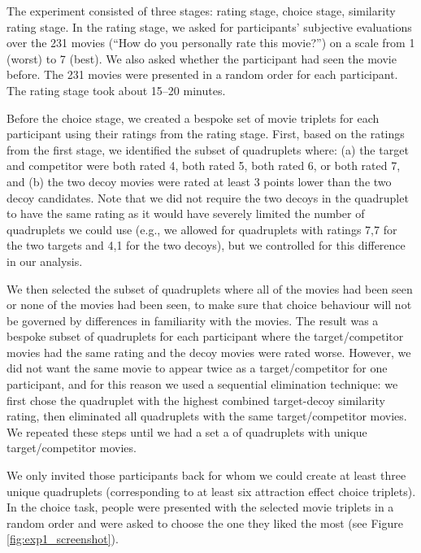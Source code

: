 \documentclass[12pt, a4paper]{article}
\begin{document}
The experiment consisted of three stages: rating stage, choice stage, similarity rating stage. In the rating stage, we asked for participants' subjective evaluations over the 231 movies (``How do you personally rate this movie?'') on a scale from 1 (worst) to 7 (best). We also asked whether the participant had seen the movie before. The 231 movies were presented in a random order for each participant. The rating stage took about 15--20 minutes.

Before the choice stage, we created a bespoke set of movie triplets for each participant using their ratings from the rating stage. First, based on the ratings from the first stage, we identified the subset of quadruplets where: (a) the target and competitor were both rated 4, both rated 5, both rated 6, or both rated 7, and (b) the two decoy movies were rated at least 3 points lower than the two decoy candidates. Note that we did not require the two decoys in the quadruplet to have the same rating as it would have severely limited the number of quadruplets we could use (e.g., we allowed for quadruplets with ratings 7,7 for the two targets and 4,1 for the two decoys), but we controlled for this difference in our analysis.

We then selected the subset of quadruplets where all of the movies had been seen or none of the movies had been seen, to make sure that choice behaviour will not be governed by differences in familiarity with the movies. The result was a bespoke subset of quadruplets for each participant where the target/competitor movies had the same rating and the decoy movies were rated worse. However, we did not want the same movie to appear twice as a target/competitor for one participant, and for this reason we used a sequential elimination technique: we first chose the quadruplet with the highest combined target-decoy similarity rating, then eliminated all quadruplets with the same target/competitor movies. We repeated these steps until we had a set a of quadruplets with unique target/competitor movies.

We only invited those participants back for whom we could create at least three unique quadruplets (corresponding to at least six attraction effect choice triplets). In the choice task, people were presented with the selected movie triplets in a random order and were asked to choose the one they liked the most (see Figure \ref{fig:exp1_screenshot}).
\end{document}
